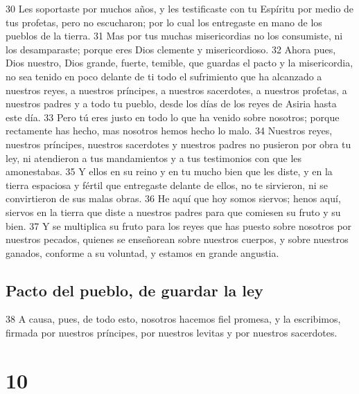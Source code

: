 30 Les soportaste por muchos años, y les testificaste con tu Espíritu por medio de tus profetas, pero no escucharon; por lo cual los entregaste en mano de los pueblos de la tierra. 
31 Mas por tus muchas misericordias no los consumiste, ni los desamparaste; porque eres Dios clemente y misericordioso.
32 Ahora pues, Dios nuestro, Dios grande, fuerte, temible, que guardas el pacto y la misericordia, no sea tenido en poco delante de ti todo el sufrimiento que ha alcanzado a nuestros reyes, a nuestros príncipes, a nuestros sacerdotes, a nuestros profetas, a nuestros padres y a todo tu pueblo, desde los días de los reyes de Asiria hasta este día.
33 Pero tú eres justo en todo lo que ha venido sobre nosotros; porque rectamente has hecho, mas nosotros hemos hecho lo malo.
34 Nuestros reyes, nuestros príncipes, nuestros sacerdotes y nuestros padres no pusieron por obra tu ley, ni atendieron a tus mandamientos y a tus testimonios con que les amonestabas.
35 Y ellos en su reino y en tu mucho bien que les diste, y en la tierra espaciosa y fértil que entregaste delante de ellos, no te sirvieron, ni se convirtieron de sus malas obras.
36 He aquí que hoy somos siervos; henos aquí, siervos en la tierra que diste a nuestros padres para que comiesen su fruto y su bien.
37 Y se multiplica su fruto para los reyes que has puesto sobre nosotros por nuestros pecados, quienes se enseñorean sobre nuestros cuerpos, y sobre nuestros ganados, conforme a su voluntad, y estamos en grande angustia.

\section*{Pacto del pueblo, de guardar la ley}

38 A causa, pues, de todo esto, nosotros hacemos fiel promesa, y la escribimos, firmada por nuestros príncipes, por nuestros levitas y por nuestros sacerdotes.

\chapter{10}

